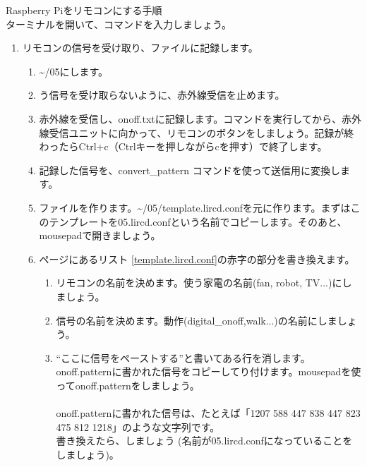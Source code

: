 \newpage
\noindent
{\large Raspberry Piをリモコンにする手順}\\
ターミナルを開いて、コマンドを入力しましょう。
\begin{enumerate}
\item リモコンの信号を受け取り、ファイルに記録します。
 \begin{enumerate}[1]
  \item \textasciitilde /05にします。\\ 
  \item {}う信号を受け取らないように、赤外線受信を止めます。 \\ 
  \item 赤外線を受信し、onoff.txtに記録します。コマンドを実行してから、赤外線受信ユニットに向かって、リモコンのボタンをしましょう。記録が終わったらCtrl+c（Ctrlキーを押しながらcを押す）で終了します。\\ 
  \item 記録した信号を、convert\_pattern コマンドを使って送信用に変換します。\\ 
  \item {}ファイルを作ります。\textasciitilde /05/template.lircd.confを元に作ります。まずはこのテンプレートを05.lircd.confという名前でコピーします。そのあと、mousepadで開きましょう。\\ 
  \item \pageref{template.lircd.conf}ページにあるリスト \ref{template.lircd.conf}の赤字の部分を書き換えます。
  \begin{enumerate}[(1)]
    \item リモコンの名前を決めます。使う家電の名前(fan, robot, TV...)にしましょう。
    \item 信号の名前を決めます。動作(digital\_onoff,walk...)の名前にしましょう。
    \item “ここに信号をペーストする”と書いてある行を消します。onoff.patternに書かれた信号をコピーしてり付けます。mousepadを使ってonoff.patternをしましょう。\\ 
\\onoff.patternに書かれた信号は、たとえば「1207 588 447 838 447 823 475 812 1218」のような文字列です。\\書き換えたら、しましょう (名前が05.lircd.confになっていることをしましょう)。

\end{enumerate}
\end{enumerate}
\end{enumerate}
